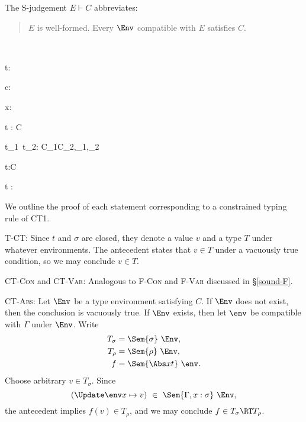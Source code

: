 \documentclass{amsart}
\begin{document}
\begin{samepage}
The S-judgement $E\vdash C$ abbreviates:
\begin{quotation}
$E$ is well-formed. Every $\Env$ compatible with $E$ satisfies $C$.
\end{quotation}
\end{samepage}


~

{t:\rho}

{\Gamma\vdash c:\rho \Given \emptyset}

{\Gamma\vdash x:\sigma\Given\emptyset}

{\Gamma\vdash{}t : \sigma\R\rho\Given C}

{\Gamma\vdash t_1~t_2:\beta
\Given C_1\cup C_2,\rho_1\le\alpha\R\beta,\rho_2\le\alpha
}

{\Gamma\vdash\Tabs\alpha t:\All\alpha\rho\Given C}

{\Gamma\vdash t :
\cdots{}\rho
\Given\emptyset}

\label{sound-CT}

We outline the proof of each statement corresponding to a
constrained typing rule of CT1.

\textsc{T-CT}: Since $t$ and $\sigma$ are closed, they denote a
value $v$ and a type $T$ under whatever environments. The
antecedent states that $v\in T$ under a vacuously true condition,
so we may conclude $v\in T$.

\textsc{CT-Con} and \textsc{CT-Var}: Analogous to \textsc{F-Con}
and \textsc{F-Var} discussed in \S\ref{sound-F}.

\textsc{CT-Abs}: Let $\Env$ be a type environment satisfying $C$.
If $\Env$ does not exist, then the conclusion is vacuously true.
If $\Env$ exists, then let $\env$ be compatible with $\Gamma$
under $\Env$. Write
\begin{align*}
T_\sigma&=\Sem{\sigma}~\Env,\\
T_\rho&=\Sem{\rho}~\Env,\\
f&=\Sem{\Abs x t}~\env.
\end{align*}
Choose arbitrary $v\in T_\sigma$. Since
\[
(\Update\env x\mapsto v)\ \in\ \Sem{\Gamma,x:\sigma}~\Env,
\]
the antecedent implies $f(v)\in T_\rho$, and we may conclude
$f\in T_\sigma \RT T_\rho$.
\end{document}
